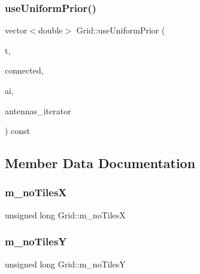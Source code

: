\subsubsection{\texorpdfstring{use\+Uniform\+Prior()}{useUniformPrior()}}
{\footnotesize\ttfamily vector$<$double$>$ Grid\+::use\+Uniform\+Prior (\begin{DoxyParamCaption}\item[{unsigned long}]{t,  }\item[{bool}]{connected,  }\item[{vector$<$ \hyperlink{class_antenna_info}{Antenna\+Info} $>$\+::iterator}]{ai,  }\item[{pair$<$ \hyperlink{_agents_collection_8h_afde47bc45d604b8b8c72755072376679}{um\+\_\+iterator}, \hyperlink{_agents_collection_8h_afde47bc45d604b8b8c72755072376679}{um\+\_\+iterator} $>$}]{antennas\+\_\+iterator }\end{DoxyParamCaption}) const\hspace{0.3cm}{\ttfamily [private]}}



\subsection{Member Data Documentation}
\mbox{\label{class_grid_a177bfdc70436c25a1510d1abe19e34c1}} 
\subsubsection{\texorpdfstring{m\+\_\+no\+TilesX}{m\_noTilesX}}
{\footnotesize\ttfamily unsigned long Grid\+::m\+\_\+no\+TilesX\hspace{0.3cm}{\ttfamily [private]}}

\mbox{\label{class_grid_a8fe14c4781dfd5623922fcc1f9c10130}} 
\subsubsection{\texorpdfstring{m\+\_\+no\+TilesY}{m\_noTilesY}}
{\footnotesize\ttfamily unsigned long Grid\+::m\+\_\+no\+TilesY\hspace{0.3cm}{\ttfamily [private]}}

\mbox{\label{class_grid_a27b99b13ac7e5bec81f7b8704bc3405a}} 
